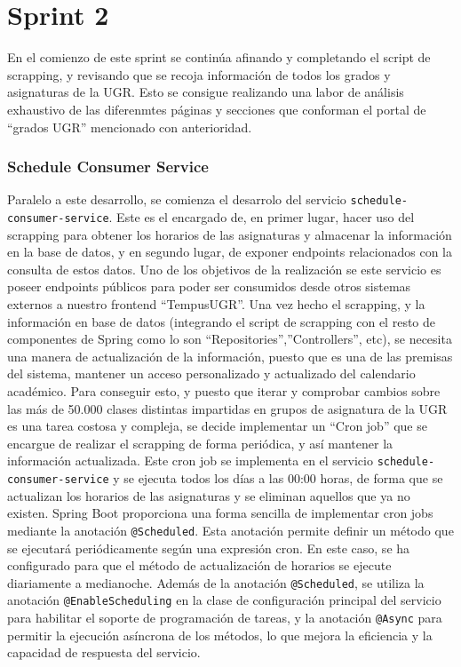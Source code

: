 \section{Sprint 2}

En el comienzo de este sprint se continúa afinando y completando el script de scrapping, y revisando que se recoja información de todos los grados y asignaturas de la UGR. Esto se consigue realizando una labor de análisis exhaustivo de las diferenmtes páginas y secciones que conforman el portal de ``grados UGR'' mencionado con anterioridad.
\subsubsection{Schedule Consumer Service}
Paralelo a este desarrollo, se comienza el desarrolo del servicio \texttt{schedule-consumer-service}. Este es el encargado de, en primer lugar, hacer uso del scrapping para obtener los horarios de las asignaturas y almacenar la información en la base de datos, y en segundo lugar, de exponer endpoints relacionados con la consulta de estos datos. Uno de los objetivos de la realización se este servicio es poseer endpoints públicos para poder ser consumidos desde otros sistemas externos a nuestro frontend ``TempusUGR''.
\newline\newline
Una vez hecho el scrapping, y la información en base de datos (integrando el script de scrapping con el resto de componentes de Spring como lo son ``Repositories'',''Controllers'', etc), se necesita una manera de actualización de la información, puesto que es una de las premisas del sistema, mantener un acceso personalizado y actualizado del calendario académico.\newline
Para conseguir esto, y puesto que iterar y comprobar cambios sobre las más de 50.000 clases distintas impartidas en grupos de asignatura de la UGR es una tarea costosa y compleja, se decide implementar un ``\hypertarget{cronjob}{Cron job}'' que se encargue de realizar el scrapping de forma periódica, y así mantener la información actualizada. Este cron job se implementa en el servicio \texttt{schedule-consumer-service} y se ejecuta todos los días a las 00:00 horas, de forma que se actualizan los horarios de las asignaturas y se eliminan aquellos que ya no existen.
\newline\newline
Spring Boot proporciona una forma sencilla de implementar cron jobs mediante la anotación \texttt{@Scheduled}. Esta anotación permite definir un método que se ejecutará periódicamente según una expresión cron. En este caso, se ha configurado para que el método de actualización de horarios se ejecute diariamente a medianoche. Además de la anotación \texttt{@Scheduled}, se utiliza la anotación \texttt{@EnableScheduling} en la clase de configuración principal del servicio para habilitar el soporte de programación de tareas, y la anotación \texttt{@Async} para permitir la ejecución asíncrona de los métodos, lo que mejora la eficiencia y la capacidad de respuesta del servicio.
